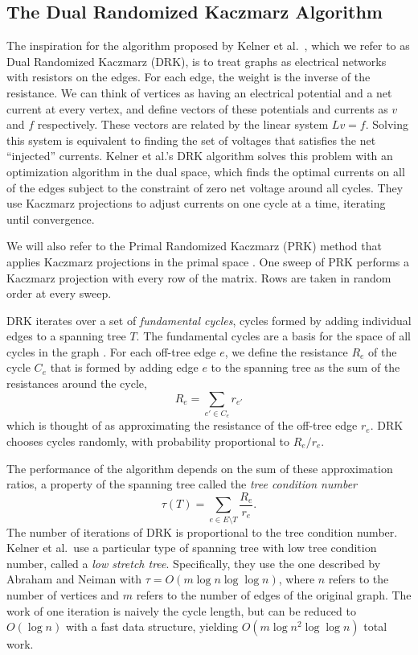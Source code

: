 \documentclass{sig-alternate}
\begin{document}
\subsection{The Dual Randomized Kaczmarz Algorithm}
The inspiration for the algorithm
proposed by Kelner et al.\ \cite{KOSZ2013},
which we refer to as Dual Randomized Kaczmarz (DRK),
is to treat graphs as electrical
networks with resistors on the edges.
For each edge, the weight is the inverse of the
resistance. We can think of vertices as having an electrical potential
and a net
current at every vertex, and define vectors of these potentials and currents as
$v$ and $f$ respectively. These vectors are related by the
linear
system $L v = f$. Solving this system is equivalent to finding
the set of voltages that satisfies the net ``injected'' currents.
Kelner et al.'s DRK
algorithm solves this problem with an optimization algorithm in the dual space,
which finds the optimal currents on all of the edges subject to the constraint
of zero net voltage around all cycles. They use Kaczmarz projections
\cite{Kaczmarz1937} to adjust currents on one cycle at a time,
iterating until convergence.

We will also refer to the
Primal Randomized Kaczmarz (PRK) method that applies Kaczmarz projections
in the primal space \cite{StrohmerVershynin2009}. One sweep of PRK performs
a Kaczmarz projection with every row of the matrix. Rows are taken in random
order at every sweep.

DRK iterates over a set of \textit{fundamental cycles},
cycles formed by adding
individual edges to a spanning tree $T$.
The fundamental cycles are a basis for the space of all cycles in the graph
\cite{Diestel2010}.
For each off-tree edge $e$, we define
the resistance $R_e$ of the cycle $C_e$ that is
formed by adding edge $e$ to the spanning tree
as the sum of the
resistances around the cycle,
\[
R_e = \sum_{e' \in C_e} r_{e'}
\]
which is thought of as approximating the
resistance of the off-tree edge $r_e$. DRK
chooses cycles randomly,
with probability proportional to $R_e/r_e$.

The performance of the algorithm depends on the sum of
these approximation ratios, a property of the spanning tree
called the \textit{tree condition number}
\[
\tau(T) = \sum_{e \in E \setminus T} \frac{R_e}{r_e}.
\]
The number of iterations of DRK is proportional to the
tree condition number.
Kelner et al.\ use
a particular type of spanning tree with low tree condition
number, called a \textit{low stretch tree}. Specifically, they
use the
one described by Abraham and Neiman \cite{AbrahamNeiman2012}
with $\tau=O(m \log{n} \log{\log{n}})$, where $n$ refers
to the number of vertices and $m$ refers to the number of edges
of the original graph.
The work of one iteration is naively the cycle length, but
can be reduced to $O(\log{n})$ with a fast data structure,
yielding $O(m \log{n}^2 \log{\log{n}})$ total work.
\end{document}
